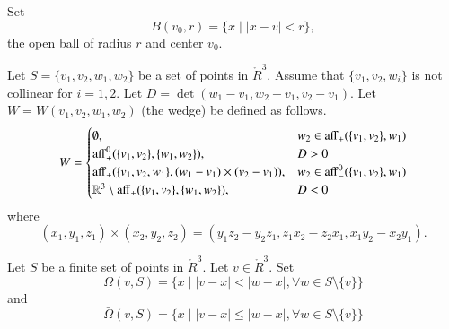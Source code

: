 \begin{tarskidata}
\begin{tarski}
\begin{definition}[ball,~B]
Set 
$$
B(v_0,r) = \{ x\mid |x - v| < r \},
$$
the open ball of radius $r$ and center $v_0$.
\end{definition}
\end{tarski}

\begin{tarski}

\begin{definition}[wedge,~W]
Let $S=\{v_1,v_2,w_1,w_2\}$ be a set of points in
$\ring{R}^3$.  Assume that $\{v_1,v_2,w_i\}$ is not collinear
for $i=1,2$. Let $D = \det(w_1-v_1,w_2-v_1,v_2-v_1)$.  
Let $W = W(v_1,v_2,w_1,w_2)$ (the wedge) be defined
as follows.  
$$
W=\begin{cases}
\emptyset,& w_2\in {\operatorname{aff}}_+(\{v_1,v_2\},w_1)\\
{\operatorname{aff}}_+^0(\{v_1,v_2\},\{w_1,w_2\}),& D > 0\\
{\operatorname{aff}}_+(\{v_1,v_2,w_1\},(w_1-v_1)\times (v_2-v_1)),&
    w_2\in{\operatorname{aff}}_-^0(\{v_1,v_2\},w_1)\\
\mathbb{R}^3\setminus{\operatorname{aff}}_+(\{v_1,v_2\},\{w_1,w_2\}),& D < 0\\
\end{cases}
$$
where 
$$
(x_1,y_1,z_1)\times (x_2,y_2,z_2) = 
(y_1 z_2 - y_2 z_1, z_1 x_2 - z_2 x_1, x_1 y_2 - x_2 y_1).
$$
\end{definition}
\end{tarski}

\begin{tarski}

\begin{definition} 
Let $S$ be a finite set of points in 
$\ring{R}^3$.  Let $v\in\ring{R}^3$. Set
  $$
  \Omega(v,S) = \{x \mid |v-x| < |w-x|, \forall w\in S\setminus\{v\}\}
  $$
and
  $$
  \bar\Omega(v,S) = \{x \mid |v-x| \le |w-x|, \forall w\in S\setminus\{v\}\}
  $$
\end{definition}
\end{tarski}
	

\end{tarskidata}
